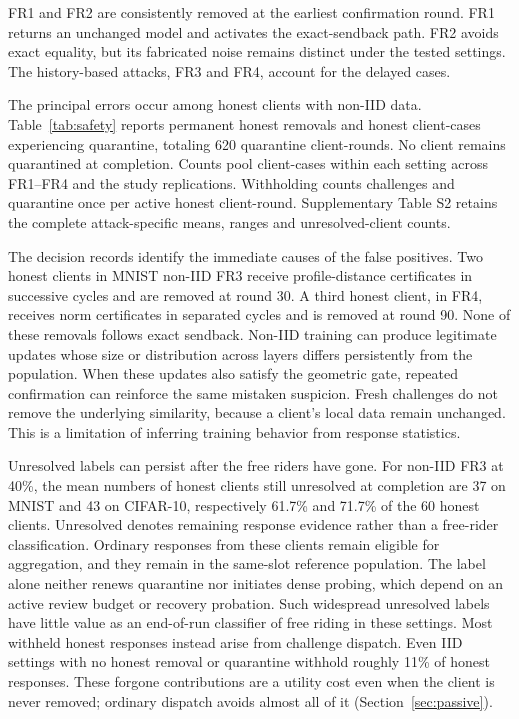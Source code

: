 \documentclass[journal]{IEEEtran}
\makeatletter
\renewcommand{\subsection}{\@startsection{subsection}{2}{\z@}{1.5ex}{0.7ex}{\normalfont\normalsize\itshape}}
\makeatother
\begin{document}
FR1 and FR2 are consistently removed at the earliest confirmation round.
FR1 returns an unchanged model and activates the exact-sendback path.
FR2 avoids exact equality, but its fabricated noise remains distinct
under the tested settings. The history-based attacks, FR3 and FR4,
account for the delayed cases.


\subsection{Honest-Client Impact}
The principal errors occur among honest clients with non-IID data.
Table~\ref{tab:safety} reports \MultiFP{} permanent honest removals and
\MultiQuarantined{} honest client-cases experiencing quarantine, totaling
620 quarantine client-rounds. No client remains quarantined at completion.
Counts pool client-cases within each setting across FR1--FR4 and the
study replications. Withholding counts challenges and quarantine once per
active honest client-round. Supplementary Table S2 retains the complete
attack-specific means, ranges and unresolved-client counts.

The decision records identify the immediate causes of the false positives.
Two honest clients in MNIST non-IID FR3 receive profile-distance
certificates in successive cycles and are removed at round 30. A third
honest client, in FR4, receives norm certificates in separated cycles
and is removed at round 90. None of these removals follows exact sendback.
Non-IID training can produce legitimate updates whose size or distribution
across layers differs persistently from the population. When these updates
also satisfy the geometric gate, repeated confirmation can reinforce the
same mistaken suspicion. Fresh challenges do not remove the underlying
similarity, because a client's local data remain unchanged. This is a
limitation of inferring training behavior from response statistics.

Unresolved labels can persist after the free riders have gone.
For non-IID FR3 at 40\%, the mean numbers of honest clients still
unresolved at completion are 37 on MNIST and 43 on CIFAR-10, respectively
61.7\% and 71.7\% of the 60 honest clients. Unresolved denotes remaining
response evidence rather than a free-rider classification.
Ordinary responses from these clients remain
eligible for aggregation, and they remain in the same-slot reference
population. The label alone neither renews quarantine nor initiates dense
probing, which depend on an active review budget or recovery probation.
Such widespread unresolved labels have little value as an end-of-run
classifier of free riding in these settings.
Most withheld honest responses instead arise from challenge dispatch.
Even IID settings with no honest removal or quarantine withhold roughly
11\% of honest responses. These forgone contributions are a utility cost
even when the client is never removed; ordinary dispatch avoids almost
all of it (Section~\ref{sec:passive}).

\end{document}
